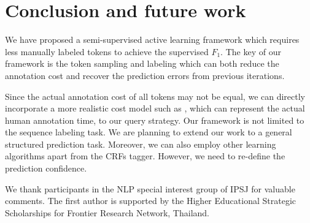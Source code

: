 \documentclass[english]{jnlp_JS2.0}
\begin{document}
\begin{table}[t]
	\label{Table:CoNLL}

\end{table}


\section{Conclusion and future work}
\label{Sec:Conclusion}

We have proposed a semi-supervised active learning framework which requires less manually labeled tokens to achieve the supervised $F_1$. The key of our framework is the token sampling and labeling which can both reduce the annotation cost and recover the prediction errors from previous iterations.

Since the actual annotation cost of all tokens may not be equal, we can directly incorporate a more realistic cost model such as \cite{Tomanek2010}, which can represent the actual human annotation time, to our query strategy. Our framework is not limited to the sequence labeling task. We are planning to extend our work to a general structured prediction task. Moreover, we can also employ other learning algorithms apart from the CRFs tagger. However, we need to re-define the prediction confidence.

\acknowledgment

We thank participants in the NLP special interest group of IPSJ for valuable comments. The first author is supported by the Higher Educational Strategic Scholarships for Frontier Research Network, Thailand.
\end{document}
